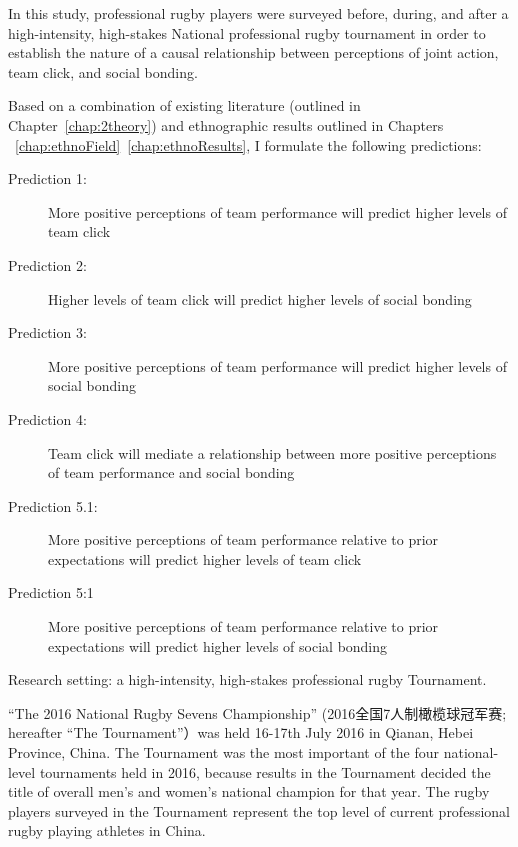 \begin{CJK}{UTF8}{gbsn}
In this study, professional rugby players were surveyed before, during, and after a high-intensity, high-stakes National professional rugby tournament in order to establish the nature of a causal relationship between perceptions of joint action, team click, and social bonding.

Based on a combination of existing literature (outlined in Chapter~\ref{chap:2theory}) and ethnographic results outlined in Chapters ~\ref{chap:ethnoField}\nobreakdash~\ref{chap:ethnoResults}, I formulate the following predictions:

\begin{description}
  \item[Prediction 1:] More positive perceptions of team performance will predict higher levels of team click
  \item[Prediction 2:] Higher levels of team click will predict higher levels of social bonding
  \item[Prediction 3:] More positive perceptions of team performance will predict higher levels of social bonding
  \item[Prediction 4:] Team click will mediate a relationship between more positive perceptions of team performance and social bonding
  \item[Prediction 5.1:] More positive perceptions of team performance relative to prior expectations will predict higher levels of team click
  \item[Prediction 5:1] More positive perceptions of team performance relative to prior expectations will predict higher levels of social bonding
\end{description}


Research setting: a high-intensity, high-stakes professional rugby Tournament.

``The 2016 National Rugby Sevens Championship'' (2016全国7人制橄榄球冠军赛; hereafter ``The Tournament''）was held 16-17th July 2016 in Qianan, Hebei Province, China. The Tournament was the most important of the four national-level tournaments held in 2016, because results in the Tournament decided the title of overall men's and women’s national champion for that year. The rugby players surveyed in the Tournament represent the top level of current professional rugby playing athletes in China.


\end{CJK}
